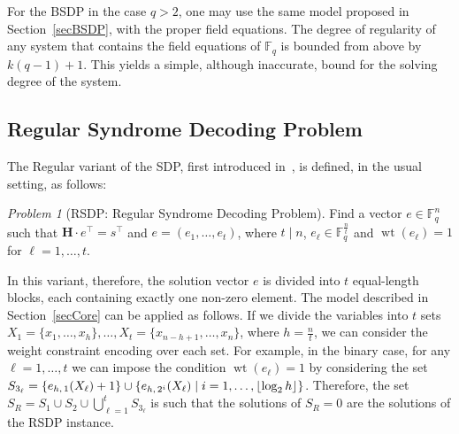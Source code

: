 \documentclass[11pt]{article}
\newcommand{\F}[0]{\mathbb{F}}
\newcommand{\Fq}[0]{\mathbb{F}_q}
\newcommand{\es}[2]{e_{#1,\, #2}}
\DeclarePairedDelimiter{\fl}{\lfloor}{\rfloor}
\theoremstyle{plain}
\theoremstyle{definition}
\theoremstyle{remark}
\newtheorem{prob}{Problem}
\begin{document}
For the BSDP in the case $q>2$, %
one may use the same model proposed in Section~\ref{secBSDP}, with the proper field equations. %
The degree of regularity of any system that contains the field equations of $\mathbb{F}_q$ is bounded from above by $k(q-1)+1$. This yields a simple, although inaccurate, bound for the solving degree of the system.

\subsection{Regular Syndrome Decoding Problem}\label{sezRSDP}
The Regular variant of the SDP, first introduced in~\cite{10.1007/11554868_6}, is defined, in the usual setting, as follows:  
\begin{prob}[RSDP: Regular Syndrome Decoding Problem]
    Find a vector $e\in\F_q^n$ such that $\mathbf{H}\cdot e^\top=s^\top$ and $e=(e_1,\dots,e_t)$, where $t\mid n$, $e_\ell\in\Fq^{\frac{n}{t}}$ and $\operatorname{wt}(e_\ell)=1$ for $\ell=1,\dots,t$.
\end{prob}
In this variant, therefore, the solution vector $e$ is divided into $t$ equal-length blocks, each containing exactly one non-zero element. The model described in Section~\ref{secCore} can be applied as follows. If we divide the variables into $t$ sets $X_1=\{x_1,\dots,x_h\},\dots,X_t=\{x_{n-h+1},\dots,x_n\}$, where $h=\frac{n}{t}$, we can consider the weight constraint encoding over each set. For example, in the binary case, for any $\ell=1,\dots,t$ we can impose the condition $\operatorname{wt}(e_\ell)=1$ by considering the set $S_{3_\ell}=\{\es{h}{1}(X_\ell)+1\}\cup\{\es{h}{2^i}(X_\ell)\mid i=1,\dots,\fl*{\operatorname{log}_2 h}\}$. Therefore, the set $S_R=S_1\cup S_2\cup\bigcup\limits_{\ell=1}^t S_{3_\ell}$ is such that the solutions of $S_R=0$ are the solutions of the RSDP instance. 
\end{document}
